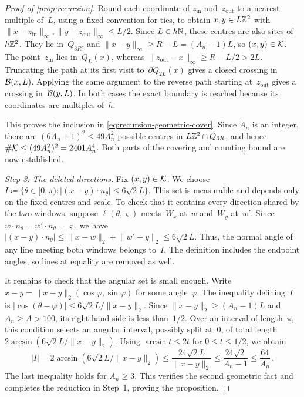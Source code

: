 \documentclass[11pt,letterpaper]{article}
\begin{document}
\begin{proof}[Proof of \cref{prop:recursion}]
Round each coordinate of $z_{\mathrm{in}}$ and~$z_{\mathrm{out}}$ to a nearest multiple of~$L$, using a fixed convention for ties, to obtain $x,y\in L\mathbb Z^2$ with $\lVert x-z_{\mathrm{in}}\rVert_\infty,\lVert y-z_{\mathrm{out}}\rVert_\infty\le L/2$. Since $L\in h\mathbb N$, these centres are also sites of~$h\mathbb Z^2$. They lie in~$Q_{3R}$, and $\lVert x-y\rVert_\infty\ge R-L=(A_n-1)L$, so $(x,y)\in\mathcal K$. The point~$z_{\mathrm{in}}$ lies in~$Q_L(x)$, whereas $\lVert z_{\mathrm{out}}-x\rVert_\infty\ge R-L/2>2L$. Truncating the path at its first visit to~$\partial Q_{2L}(x)$ gives a closed crossing in~$\mathcal B(x,L)$. Applying the same argument to the reverse path starting at~$z_{\mathrm{out}}$ gives a crossing in~$\mathcal B(y,L)$. In both cases the exact boundary is reached because its coordinates are multiples of~$h$.

This proves the inclusion in \eqref{eq:recursion-geometric-cover}. Since $A_n$ is an integer, there are $(6A_n+1)^2\le49A_n^2$ possible centres in $L\mathbb Z^2\cap Q_{3R}$, and hence $\#\mathcal K\le(49A_n^2)^2=2401A_n^4$. Both parts of the covering and counting bound are now established.

\emph{Step 3: The deleted directions.} Fix $(x,y)\in\mathcal K$. We choose $I\coloneqq\{\theta\in[0,\pi)\colon\lvert(x-y)\cdot n_\theta\rvert\le6\sqrt2L\}$. This set is measurable and depends only on the fixed centres and scale. To check that it contains every direction shared by the two windows, suppose $\ell(\theta,\varsigma)$ meets~$W_x$ at~$w$ and~$W_y$ at~$w'$. Since $w\cdot n_\theta=w'\cdot n_\theta=\varsigma$, we have $\lvert(x-y)\cdot n_\theta\rvert\le\lVert x-w\rVert_2+\lVert w'-y\rVert_2\le6\sqrt2L$. Thus, the normal angle of any line meeting both windows belongs to~$I$. The definition includes the endpoint angles, so lines at equality are removed as well.

It remains to check that the angular set is small enough. Write $x-y=\lVert x-y\rVert_2(\cos\varphi,\sin\varphi)$ for some angle~$\varphi$. The inequality defining~$I$ is $\lvert\cos(\theta-\varphi)\rvert\le6\sqrt2L/\lVert x-y\rVert_2$. Since $\lVert x-y\rVert_2\ge(A_n-1)L$ and $A_n\ge A>100$, its right-hand side is less than~$1/2$. Over an interval of length~$\pi$, this condition selects an angular interval, possibly split at~$0$, of total length $2\arcsin(6\sqrt2L/\lVert x-y\rVert_2)$. Using $\arcsin t\le2t$ for $0\le t\le1/2$, we obtain
\begin{equation}\label{eq:recursion-angular-bound}
  \lvert I\rvert=2\arcsin(6\sqrt2L/\lVert x-y\rVert_2)\le\frac{24\sqrt2L}{\lVert x-y\rVert_2}\le\frac{24\sqrt2}{A_n-1}\le\frac{64}{A_n}\,.
\end{equation}
The last inequality holds for $A_n\ge3$. This verifies the second geometric fact and completes the reduction in Step~1, proving the proposition.
\end{proof}
\end{document}
